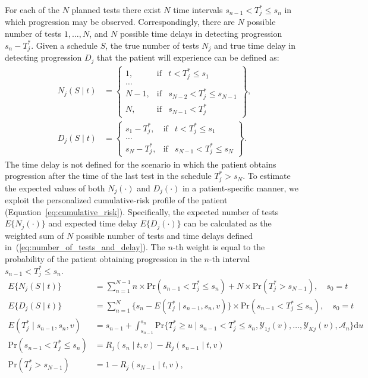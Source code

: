For each of the $N$ planned tests there exist $N$ time intervals ${s_{n-1} < T^*_j \leq s_n}$ in which progression may be observed. Correspondingly, there are $N$ possible number of tests $1,\ldots, N$, and $N$ possible time delays in detecting progression $s_n - T^*_j$. Given a schedule $S$, the true number of tests $N_j$ and true time delay in detecting progression $D_j$ that the patient will experience can be defined as:
\begin{equation}
\label{eq:number_of_tests_and_delay}
\begin{split}
N_j (S \mid t) &= \left\{ \begin{array}{lcr}
  1, &\mbox{if}& t < T^*_j \leq s_1\\
  \ldots \\
  N-1, &\mbox{if}& s_{N-2} < T^*_j \leq s_{N-1}\\
  N, &\mbox{if}& s_{N-1} < T^*_j  
\end{array} \right\},\\
D_j (S \mid t) &= \left\{ \begin{array}{lcrr}
  s_1 - T^*_j, &\mbox{if}& t < T^*_j \leq s_1\\
  \ldots \\
  s_N - T^*_j, &\mbox{if}& s_{N-1} < T^*_j \leq s_N  
\end{array} \right\}.
\end{split}
\end{equation}
The time delay is not defined for the scenario in which the patient obtains progression after the time of the last test in the schedule $T^*_j > s_N$. To estimate the expected values of both $N_j(\cdot)$ and $D_j(\cdot)$ in a patient-specific manner, we exploit the personalized cumulative-risk profile of the patient (Equation~\ref{eq:cumulative_risk}). Specifically, the expected number of tests $E\{N_j(\cdot)\}$ and expected time delay $E\{D_j(\cdot)\}$ can be calculated as the weighted sum of $N$ possible number of tests and time delays defined in~(\ref{eq:number_of_tests_and_delay}). The $n$-th weight is equal to the probability of the patient obtaining progression in the $n$-th interval ${s_{n-1} < T^*_j \leq s_n}$.
\begin{equation}
\label{eq:expected_number_of_tests_and_delay}
\begin{split}
E\big\{N_j(S \mid t)\big\} &= \sum_{n=1}^{N-1} n \times \mbox{Pr}(s_{n-1} < T^*_j \leq s_n) + N \times \mbox{Pr}(T^*_j > s_{N-1}), \quad s_0 = t\\
E\big\{D_j(S \mid t)\big\} &= \sum_{n=1}^{N} \Big\{s_n - E(T^*_j \mid s_{n-1}, s_n, v)\Big\} \times \mbox{Pr}(s_{n-1} < T^*_j \leq s_n) , \quad s_0 = t\\
E(T^*_j \mid s_{n-1}, s_n, v) &= s_{n-1} + \int_{s_{n-1}}^{s_n} \mbox{Pr}\Big\{T^*_j \geq u \mid s_{n-1} < T^*_j \leq s_n, \mathcal{Y}_{1j}(v), \ldots, \mathcal{Y}_{Kj}(v), \mathcal{A}_n\Big\} \mathrm{d}u\\
\mbox{Pr}(s_{n-1} < T^*_j \leq s_n) &= R_j(s_n \mid t, v) - R_j(s_{n-1} \mid t, v)\\
\mbox{Pr}(T^*_j > s_{N-1}) &= 1- R_j(s_{N-1} \mid t, v),
\end{split}
\end{equation}
